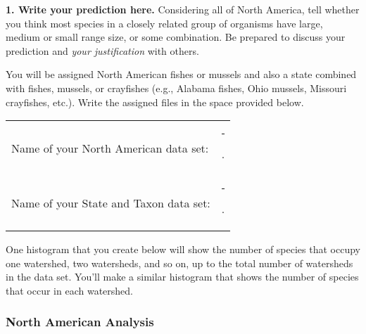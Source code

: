\documentclass[11pt]{article}
\begin{document}
\textbf{1. Write your prediction here.} Considering all of North America, tell
whether you think most species in a closely related group of organisms
have large, medium or small range size, or some combination. Be prepared
to discuss your prediction and \emph{your justification} with others.

\vspace{6\baselineskip}

You will be assigned North American fishes or mussels and also a state combined with fishes, mussels, or crayfishes  (e.g., Alabama fishes, Ohio mussels, Missouri crayfishes, etc.). Write the assigned
files in the space provided below.

\vspace{2ex}

\begin{tabular}{@{}ll@{}}
	Name of your North American data set: & \rule{2in}{0.4pt}.\\[3ex]
	
	Name of your State and Taxon data set: & \rule{2in}{0.4pt}.\\
\end{tabular}


%
%
%
%

One histogram that you create below will show the number of species that
occupy one watershed, two watersheds, and so on, up to the total number
of watersheds in the data set. You'll make a similar histogram that shows the 
number of species that occur in each watershed.

\subsubsection*{North American Analysis}
\end{document}
